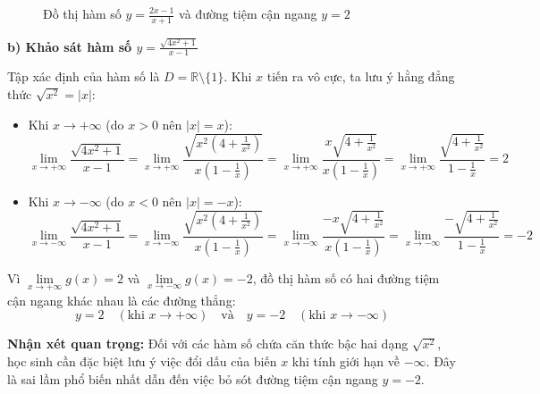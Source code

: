 \documentclass[12pt]{article}
\begin{document}
\begin{loigiai}
\begin{figure}[H]
			\caption{Đồ thị hàm số $y = \frac{2x - 1}{x + 1}$ và đường tiệm cận ngang $y = 2$}
		\end{figure}
		
		\textbf{b) Khảo sát hàm số $y = \frac{\sqrt{4x^2 + 1}}{x - 1}$}
		
		Tập xác định của hàm số là $D = \mathbb{R} \setminus \{1\}$. Khi $x$ tiến ra vô cực, ta lưu ý hằng đẳng thức $\sqrt{x^2} = |x|$:
		\begin{itemize}
			\item Khi $x \to +\infty$ (do $x > 0$ nên $|x| = x$):
			\[ \lim_{x \to +\infty} \frac{\sqrt{4x^2 + 1}}{x - 1} = \lim_{x \to +\infty} \frac{\sqrt{x^2\left(4 + \frac{1}{x^2}\right)}}{x\left(1 - \frac{1}{x}\right)} = \lim_{x \to +\infty} \frac{x\sqrt{4 + \frac{1}{x^2}}}{x\left(1 - \frac{1}{x}\right)} = \lim_{x \to +\infty} \frac{\sqrt{4 + \frac{1}{x^2}}}{1 - \frac{1}{x}} = 2 \]
			\item Khi $x \to -\infty$ (do $x < 0$ nên $|x| = -x$):
			\[ \lim_{x \to -\infty} \frac{\sqrt{4x^2 + 1}}{x - 1} = \lim_{x \to -\infty} \frac{\sqrt{x^2\left(4 + \frac{1}{x^2}\right)}}{x\left(1 - \frac{1}{x}\right)} = \lim_{x \to -\infty} \frac{-x\sqrt{4 + \frac{1}{x^2}}}{x\left(1 - \frac{1}{x}\right)} = \lim_{x \to -\infty} \frac{-\sqrt{4 + \frac{1}{x^2}}}{1 - \frac{1}{x}} = -2 \]
		\end{itemize}
		Vì $\lim\limits_{x \to +\infty} g(x) = 2$ và $\lim\limits_{x \to -\infty} g(x) = -2$, đồ thị hàm số có hai đường tiệm cận ngang khác nhau là các đường thẳng:
		\[ y = 2 \quad (\text{khi } x \to +\infty) \quad \text{và} \quad y = -2 \quad (\text{khi } x \to -\infty) \]
		
		\textbf{Nhận xét quan trọng:} Đối với các hàm số chứa căn thức bậc hai dạng $\sqrt{x^2}$, học sinh cần đặc biệt lưu ý việc đổi dấu của biến $x$ khi tính giới hạn về $-\infty$. Đây là sai lầm phổ biến nhất dẫn đến việc bỏ sót đường tiệm cận ngang $y = -2$.
	\end{loigiai}
	
\end{document}
